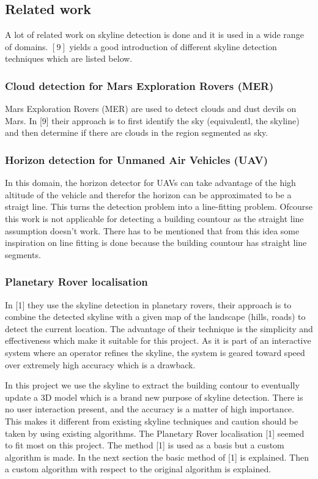 \documentclass[10pt]{article}
\begin{document}
 \subsection{Related work}
A lot of related work on skyline detection is done and it is used in a wide
range of domains. $[9]$ yields a good introduction of different skyline
detection techniques which are listed below.

\subsubsection{Cloud detection for Mars Exploration Rovers (MER)}
Mars Exploration Rovers (MER) are used to detect clouds and dust devils on Mars.
In [9] their approach is to first identify the sky (equivalentl, the skyline)
and then determine if there are clouds in the region segmented as sky.

\subsubsection{Horizon detection for Unmaned Air Vehicles (UAV)}
In this domain, the horizon detector for UAVs can take advantage of the high
altitude of the vehicle and therefor the horizon can be approximated to be a
straigt line.  This turns the detection problem into a line-fitting problem.
Ofcourse this work is not applicable for detecting a building countour as the
straight line assumption doesn't work. There has to be mentioned that from this
idea some inspiration on line fitting is done because the building countour has
straight line segments.

\subsubsection{Planetary Rover localisation}
In [1] they use the skyline detection in planetary rovers, their approach is to
combine the detected skyline with a given map of the landscape (hills, roads) to
detect the current location. 
The advantage of their technique is the simplicity and effectiveness which make
it suitable for this project.  As it is part of an interactive system where an
operator refines the skyline, the system is geared toward speed over extremely
high accuracy which is a drawback. 



In this project we use the skyline to extract the building contour to eventually
update a 3D model which is a brand new purpose of skyline detection.  There is
no user interaction present, and the accuracy is a matter of high importance.
This makes it different from existing skyline techniques and caution should be
taken by using existing algorithms.
The Planetary Rover localisation [1] seemed to fit most on this project.
The method [1] is used as a basis but a custom algorithm is made. 
In the next section the basic method of [1] is explained. Then a custom algorithm
with respect to the original algorithm is explained.  
\end{document}
